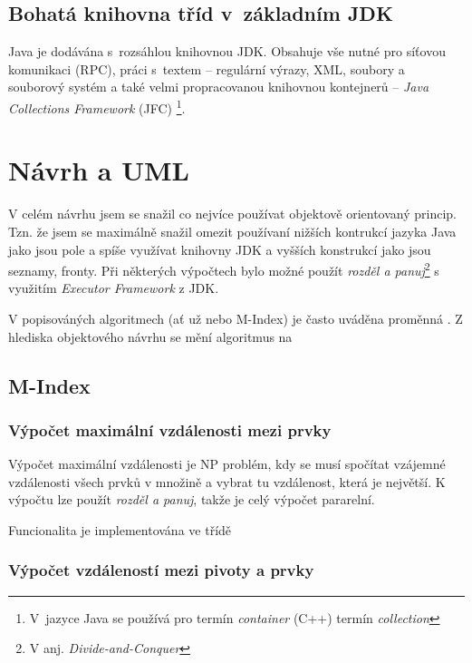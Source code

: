 \subsection{Bohatá knihovna tříd v~základním JDK}

Java je dodávána s~rozsáhlou knihovnou JDK. Obsahuje vše nutné
pro síťovou komunikaci (RPC), práci s~textem -- regulární výrazy,
XML, soubory a souborový
systém a také velmi propracovanou knihovnou kontejnerů -- \emph{Java
Collections Framework }(JFC)
\footnote{V~jazyce Java se používá pro termín \emph{container} (C++) termín
\emph{collection}}.

\section{Návrh a UML}
V celém návrhu jsem se snažil co nejvíce používat objektově orientovaný princip. Tzn. že jsem se maximálně snažil omezit používaní nižších kontrukcí jazyka Java jako jsou pole a spíše využívat knihovny JDK a vyšších konstrukcí jako jsou seznamy, fronty. Při některých výpočtech bylo možné použít \emph{rozděl a panuj}\cite{Cormen:2001:IA:580470}\footnote{V anj. \emph{Divide-and-Conquer}} s využitím \emph{Executor Framework} z JDK.

V popisováných algoritmech (ať už \BPTree{} nebo M-Index) je často uváděna proměnná . Z hlediska objektového návrhu se mění algoritmus na

\subsection{\BPTree}
\subsection{M-Index}
\subsubsection{Výpočet maximální vzdálenosti mezi prvky}
Výpočet maximální vzdálenosti je NP problém, kdy se musí spočítat vzájemné vzdálenosti všech prvků v množině a vybrat tu vzdálenost, která je největší. K výpočtu lze použít \emph{rozděl a panuj}, takže je celý výpočet pararelní.

Funcionalita je implementována ve třídě 
\subsubsection{Výpočet vzdáleností mezi pivoty a prvky}
